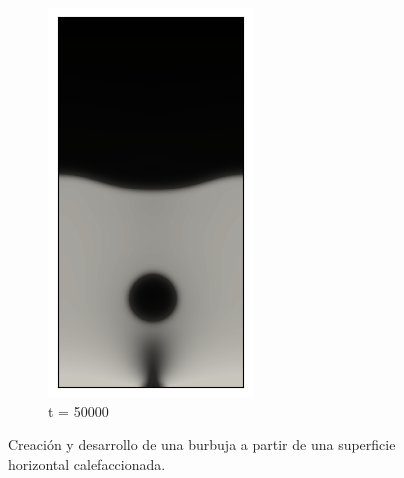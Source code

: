 \begin{figure}[h!]
\begin{subfigure}{0.25\textwidth}
		\includegraphics[width=\linewidth]{figs/cap4/bubble_50}
		\caption{t = 50000}
		\label{fig:9}
	\end{subfigure}
	\caption{Creación y desarrollo de una burbuja a partir de una superficie horizontal calefaccionada.}
	\label{fig:secuencia_burbujas}
\end{figure}



\newpage






